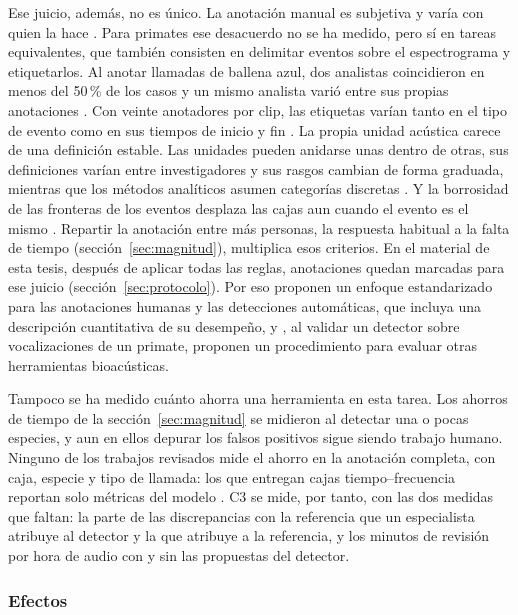 Ese juicio, además, no es único. La anotación manual es subjetiva y varía con
quien la hace \citep{nguyen_assessing_2021}. Para primates ese desacuerdo no se ha
medido, pero sí en tareas equivalentes, que también consisten en delimitar
eventos sobre el espectrograma y etiquetarlos. Al anotar llamadas de ballena azul,
dos analistas coincidieron en menos del 50\,\% de los casos y un mismo analista
varió entre sus propias anotaciones \citep{leroy_reliability_2018}. Con veinte
anotadores por clip, las etiquetas varían tanto en el tipo de evento como en sus
tiempos de inicio y fin \citep{koga_lead_2024}. La propia unidad acústica carece
de una definición estable. Las unidades pueden anidarse unas dentro de otras, sus
definiciones varían entre investigadores y sus rasgos cambian de forma graduada,
mientras que los métodos analíticos asumen categorías discretas
\citep{kershenbaum_acoustic_2016}. Y la borrosidad de las fronteras de los eventos
desplaza las cajas aun cuando el evento es el mismo \citep{zhu_sound_2025}.
Repartir la anotación entre más personas, la respuesta habitual a la falta de
tiempo (sección~\ref{sec:magnitud}), multiplica esos criterios. En el material de
esta tesis, después de aplicar todas las reglas, \nReview{} anotaciones quedan
marcadas para ese juicio (sección~\ref{sec:protocolo}). Por eso
\citet{leroy_reliability_2018} proponen un enfoque estandarizado para las
anotaciones humanas y las detecciones automáticas, que incluya una descripción
cuantitativa de su desempeño, y \citet{romero-mujalli_utilizing_2021}, al validar
un detector sobre vocalizaciones de un primate, proponen un procedimiento para
evaluar otras herramientas bioacústicas.

Tampoco se ha medido cuánto ahorra una herramienta en esta tarea. Los ahorros de
tiempo de la sección~\ref{sec:magnitud} se midieron al detectar una o pocas
especies, y aun en ellos depurar los falsos positivos sigue siendo trabajo
humano. Ninguno de los trabajos revisados mide el ahorro en la anotación
completa, con caja, especie y tipo de llamada: los que entregan cajas
tiempo--frecuencia reportan solo métricas del modelo
\citep{escobar-amado_computer_2024,airale_nbm_2025,zhu_sound_2025}. C3 se mide,
por tanto, con las dos medidas que faltan: la parte de las discrepancias con la
referencia que un especialista atribuye al detector y la que atribuye a la
referencia, y los minutos de revisión por hora de audio con y sin las propuestas
del detector.

\subsubsection{Efectos}
\label{sec:efectos}

